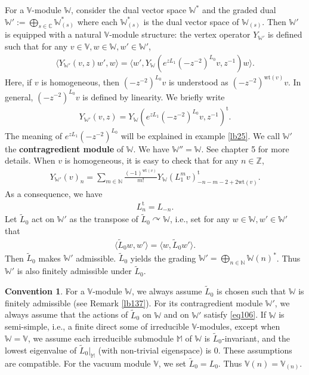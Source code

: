 \documentclass[12pt,a4paper,notitlepage]{report}
\theoremstyle{definition}
\newtheorem{cv}[df]{Convention}
\theoremstyle{plain}
\newcommand{\wtd}{\widetilde}
\newcommand{\tr}{\mathrm{t}} %
\newcommand{\bk}[1]{\langle {#1}\rangle}
\newcommand{\mbb}{\mathbb}
\newcommand{\Vbb}{\mathbb V}
\newcommand{\Wbb}{\mathbb W}
\newcommand{\Mbb}{\mathbb M}
\newcommand{\Nbb}{\mathbb N}
\newcommand{\wt}{\mathrm{wt}}
\numberwithin{equation}{section}
\begin{document}
For a $\Vbb$-module $\Wbb$, consider the dual vector space $\Wbb^*$ and the graded dual $\Wbb':=\bigoplus_{s\in\mbb C}\Wbb_{(s)}^*$ where each $\Wbb_{(s)}^*$ is the dual vector space of $\Wbb_{(s)}$. \index{W@$\Wbb',\Wbb^*$} Then $\Wbb'$ is equipped with a natural $\Vbb$-module structure: the vertex operator $Y_{\Wbb'}$ is defined such that for any $v\in\Vbb,w\in\Wbb,w'\in\Wbb'$,
\begin{align}
\bk{Y_{\Wbb'}(v,z)w',w}=\bk{w',Y_{\Wbb}(e^{zL_1}(-z^{-2})^{L_0} v,z^{-1})w}.\label{eq41}
\end{align}
Here, if $v$ is homogeneous, then $(-z^{-2})^{L_0}v$ is understood as $(-z^{-2})^{\wt(v)}v$. In general, $(-z^{-2})^{L_0}v$ is defined by linearity. We briefly write
\begin{align}
Y_{\Wbb'}(v,z)=Y_{\Wbb}(e^{zL_1}(-z^{-2})^{L_0} v,z^{-1})^\tr.\label{eq72}
\end{align}
The meaning of $e^{zL_1}(-z^{-2})^{L_0}$ will be explained in example \ref{lb25}. We call $\Wbb'$ the \textbf{contragredient module} of $\Wbb$. We have $\Wbb''=\Wbb$. See \cite{FHL93} chapter 5 for more details. When $v$ is homogeneous, it is easy to check that for any $n\in\mbb Z$,
\begin{align}
Y_{\Wbb'}(v)_n=\sum_{m\in\mathbb N}\frac{(-1)^{\wt(v)}}{m!}Y_\Wbb(L_1^mv)_{-n-m-2+2\wt(v)}^\tr.\label{eq211}
\end{align}
As a consequence, we have
\begin{align}
L_n^\tr=L_{-n}.
\end{align}
Let $\wtd L_0$ act on $\Wbb'$ as the transpose of $\wtd L_0\curvearrowright\Wbb$, i.e., set for any $w\in\Wbb,w'\in\Wbb'$ that
\begin{align}
\bk{\wtd L_0 w,w'}=\bk{w,\wtd L_0 w'}.\label{eq106}
\end{align}
Then $\wtd L_0$ makes $\Wbb'$ admissible. $\wtd L_0$ yields the grading $\Wbb'=\bigoplus_{n\in\Nbb}\Wbb(n)^*$. Thus $\Wbb'$ is also finitely admissible under $\wtd L_0$.


\begin{cv}\label{lb36}
For a $\Vbb$-module $\Wbb$, we always assume $\wtd L_0$ is chosen such that $\Wbb$ is finitely admissible (see Remark \ref{lb137}). For its contragredient module $\Wbb'$, we always assume that the actions of $\wtd L_0$ on $\Wbb$ and on $\Wbb'$ satisfy \eqref{eq106}.  If $\Wbb$ is semi-simple, i.e., a finite direct some of irreducible $\Vbb$-modules, except when $\Wbb=\Vbb$, we assume  each irreducible submodule $\Mbb$ of $\Wbb$  is $\wtd L_0$-invariant, and the lowest eigenvalue of $\wtd L_0|_{\Mbb}$ (with non-trivial eigenspace) is $0$. These  assumptions are compatible. For the vacuum module $\Vbb$, we set $\wtd L_0=L_0$. Thus $\Vbb(n)=\Vbb_{(n)}$.
\end{cv}
\end{document}
